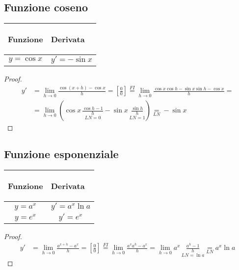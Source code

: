 \documentclass{book}     %
\begin{document}
\subsection{Funzione coseno}
\begin{center}
    \begin{tabular}{m{}|m{}}
        \begin{center}
            \textbf{Funzione}
        \end{center}
        & 
        \begin{center}
            \textbf{Derivata}
        \end{center}\\
        \hline
            \[y=\cos x\]&
            \[y'=- \sin x\]
    \end{tabular}
\end{center}
\begin{proof}
    \[\begin{aligned}y'&=\lim_{h\to 0}\frac{\cos(x+h)-\cos x}{h}=\left[ \frac{0}{0} \right]\overset{FI}{=}\lim_{h\to 0}\frac{\cos x \cos h - \sin x \sin h - \cos x}{h}=\\&=\lim_{h\to 0}\left(\cos x\,\underset{LN=0}{\boxed{\frac{\cos h-1}{h}}}-\sin x\,\underset{LN=1}{\boxed{\frac{\sin h}{h}}}\right)\underset{LN}=-\sin x\end{aligned}\]
\end{proof}

\subsection{Funzione esponenziale}
\begin{center}
    \begin{tabular}{m{}|m{}}
        \begin{center}
            \textbf{Funzione}
        \end{center}
        & 
        \begin{center}
            \textbf{Derivata}
        \end{center}\\
        \hline
            \[y=a^x\]&
            \[y'=a^x\ln a\] \\
            \[y=e^x\] & 
            \[y'=e^x\]
    \end{tabular}
\end{center}
\begin{proof}
    \[\begin{aligned}y'&=\lim_{h\to 0}\frac{a^{x+h}-a^x}{h}=\left[ \frac{0}{0} \right]\overset{FI}{=}\lim_{h\to 0}\frac{a^xa^h-a^x}{h}=\lim_{h\to 0}a^x\,\underset{LN=\ln a}{\boxed{\frac{a^h-1}{h}}}\underset{LN}=a^x\ln a\end{aligned}\]
\end{proof}
\end{document}
